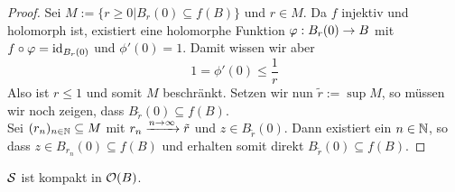 \begin{proof}
  Sei $M:= \{ r\geq 0| B_r(0) \subseteq f(B) \}$ und $r \in M$. Da $f$ injektiv und
  holomorph ist, existiert eine holomorphe Funktion $\phi: B_r(0) \ra
  B$ mit $f \circ \phi = \id_{B_r(0)}$ und $\phi'(0) = 1$. Damit wissen
  wir aber
  \[
  1 = \phi'(0) \leq \frac{1}{r}
  \]
  Also ist $r \leq 1$ und somit $M$ beschränkt. Setzen wir nun $\tilde
  r := \sup M$, so müssen wir noch zeigen, dass $B_{\tilde r}(0) \subseteq
  f(B)$.\\
  Sei $(r_n)_{n \in \N}\subseteq M$ mit $r_n \xrightarrow{n \ra
    \infty} \tilde r$ und $z \in B_{\tilde r}(0)$. Dann existiert ein $n \in \N$,
  so dass $z \in B_{r_n}(0)\subseteq f(B)$ und erhalten somit direkt
  $B_{\tilde r}(0) \subseteq f(B)$.
\end{proof}

\begin{thm}
  \label{thm:schlicht-kompakt}
  $\S$ ist kompakt in $\hol(B)$.
\end{thm}

